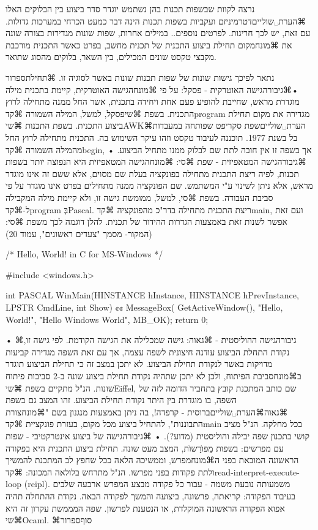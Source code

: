 {נרצה לקוות שבשפות תכנות בהן נשתמש יוגדר סדר ביצוע בין הבלוקים האלו ⌘הערת␣שוליים{דטרמיניזם ועקביות בשפות תכנות הינה דבר כמעט הכרחי במערכות גדולות. עם זאת, יש לכך חריגות. לפרטים נוספים.}. במילים אחרות, שפות שונות מגדירות בצורה שונה את ⌘מונח{מקום תחילת ביצוע התכנית} של תכנית מחשב, בפרט כאשר התכנית מורכבת מקבצי טקסט שונים המכילים, בין השאר, בלוקים מהסוג שתואר. 

נתאר לפיכך גישות שונות של שפות תכנות שונות באשר לסוגיה זו.
⌘תחילת{ספרור}
•⌘גיבור{הגישה האוטרקית - פסקל:} על פי ⌘מונח{הגישה האוטרקית}, קיימת בתכנית מילה מוגדרת מראש, שחייבת להופיע פעם אחת ויחידה בתכנית, אשר החל ממנה מתחילה לרוץ התכנית. בשפת ⌘שי{פסקל}, למשל, המילה השמורה ⌘קד{program} מגדירה את מקום תחילת ביצוע התכנית. בשפת התכנות ⌘שי{AWK}⌘הערת␣שוליים{שפת סקריפט שפותחה במעבדות בל בשנת 1977. תוכננה לעיבוד טקסט וזהו עיקר השימוש בה.} התכנית מתחילה לרוץ החל מהמילה השמורה ⌘קד{begin}, אך בשפה זו אין חובה לתת שם לבלוק ממנו מתחיל הביצוע.
• ⌘גיבור{הגישה המטאפיזית - שפת ⌘סי:} ⌘מונח{הגישה המטאפיזית} היא הנפוצה יותר בשפות תכנות, לפיה ריצת התכנית מתחילה בפונקציה בעלת שם מסוים, אלא ששם זה אינו מוגדר מראש, אלא ניתן לשינוי ע"י המשתמש. שם הפונקציה ממנה מתחילים 
בפרט אינו מוגדר על פי סביבת העבודה. בשפת ⌘סי, למשל, ממומשת גישה זו, ולא קיימת מילה המקבילה
ל-⌘קד{program} בְּPascal. ריצת התכנית מתחילה בדר"כ מהפונקציה ⌘קד{main}, ועם זאת אפשר לשנות זאת באמצעות
הגדרות ההידור של תכנית. להלן דוגמה לכך משפת ⌘סי: (המקור- מסמך "צעדים ראשונים", עמוד 20)
\begin{CPPn}
  /* Hello, World! in C for MS-Windows */

  #include <windows.h>

  int PASCAL WinMain(HINSTANCE hInstance,
  HINSTANCE hPrevInstance, LPSTR CmdLine, int Show)
  {¢¢
    MessageBox(
    GetActiveWindow(),
    "Hello, World!",
    "Hello Windows World",
    MB_OK);
    return 0;
  }
\end{CPPn}
• ⌘גיבור{הגישה ההוליסטית - ⌘גאוה:} גישה שמכלילה את הגישה הקודמת. לפי גישה זו, נקודת התחלת הביצוע עודנה חיצונית לשפה עצמה, אך עם זאת השפה מגדירה קביעות מדויקות באשר לנקודת תחילת הביצוע. לא יתכן במצב זה כי תחילת הביצוע תוגדר ב⌘מונח{סביבת הפיתוח}, ולכן לא יתכן שתהיה נקודת תחילת ביצוע שונה ב-2 סביבות פיתוח שונות. הנ"ל מתקיים בשפת ⌘שי{Eiffel}, שם כותב המתכנת קובץ בתחביר הדומה לזה של השפה, בו מוגדרת בין היתר נקודת תחילת הביצוע. זהו המצב גם בשפת ⌘גאוה⌘הערת␣שוליים{ברוסית - קרפדה!}, בה ניתן באמצעות מנגנון בשם "⌘מונח{צורת התבוננות}", להתחיל ביצוע מכל מקום, בעזרת פונקציית ⌘קד{main} בכל מחלקה. הנ"ל מציב קושי בתכנון שפה יבילה והוליסטית (מדוע?).
• ⌘גיבור{הגישה של ביצוע אינטרקטיבי - שפות עם מפרשים:} בשפות מֵפוׂרַשוׂת, המצב מעט שונה. תחילת ביצוע התכנית היא בפקודה הראשונה המובאת בפני ה⌘מונח{מפרש}, וממשיכה הלאה ככל שחפץ לב המתכנת להמשיך ולתת פקודות בפני מפרשו. הנ"ל מתרחש בלולאה המכונה: ⌘קד{read-interpret-execute-loop (reipl)}. משמעותה נובעת משמה - עבור כל פקודה מבצע המפרש ארבעה שלבים בעיבוד הפקודה: קריאתה, פרשונה, ביצועה והמשך לפקודה הבאה. נקודת ההתחלה תהיה אפוא הפקודה הראשונה המוקלדת, או הנטענת לפרשון. שפה המממשת עקרון זה היא  ⌘שי{Ocaml}.
⌘סוף{ספרור}

}
